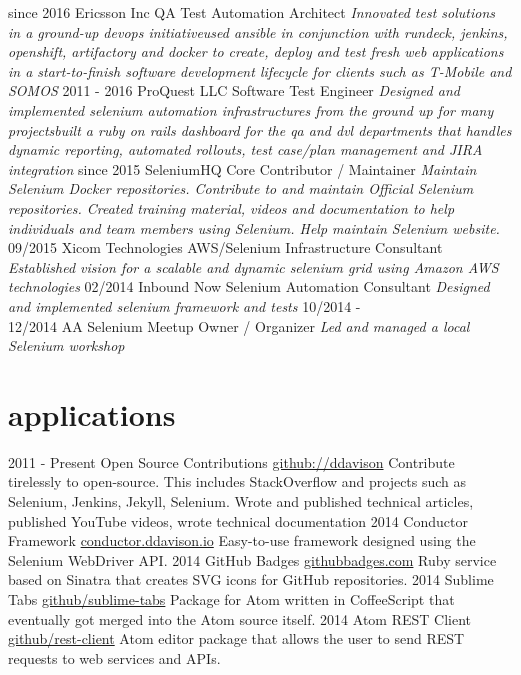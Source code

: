 \documentclass[]{ddavison-resume}
\begin{document}
\begin{entrylist}
  \entry
         {since 2016}
         {Ericsson Inc}
         {QA Test Automation Architect}
         {\emph{Innovated test solutions in a ground-up devops initiative\bullet used ansible in conjunction with rundeck, jenkins, openshift, artifactory and docker to create, deploy and test fresh web applications in a start-to-finish software development lifecycle for clients such as T-Mobile and SOMOS}}
  \entry
  	{2011 - 2016}
  	{ProQuest LLC}
  	{Software Test Engineer}
  	{\emph{Designed and implemented selenium automation infrastructures from the ground up for many projects\bullet built a ruby on rails dashboard for the qa and dvl departments that handles dynamic reporting, automated rollouts, test case/plan management and JIRA integration}} 
  \entry
  	{since 2015}
  	{SeleniumHQ}
  	{Core Contributor / Maintainer}
  	{\emph{Maintain Selenium Docker repositories.  Contribute to and maintain Official Selenium repositories. Created training material, videos and documentation to help individuals and team members using Selenium.  Help maintain Selenium website.}}
  \entry
  	{09/2015}
  	{Xicom Technologies}
  	{AWS/Selenium Infrastructure Consultant}
  	{\emph{Established vision for a scalable and dynamic selenium grid using Amazon AWS technologies}}
  \entry
  	{02/2014}
  	{Inbound Now}
  	{Selenium Automation Consultant}
  	{\emph{Designed and implemented selenium framework and tests}}
  \entry
  	{10/2014 - \\
  	12/2014}
  	{AA Selenium Meetup}
  	{Owner / Organizer}
  	{\emph{Led and managed a local Selenium workshop}}
\end{entrylist}

\section{applications}

\begin{entrylist}
  \entry
    {2011 - Present}
    {Open Source Contributions}
    {\href{https://github.com/ddavison}{github://ddavison}}
    {Contribute tirelessly to open-source.  This includes StackOverflow and projects such as Selenium, Jenkins, Jekyll, Selenium. Wrote and published technical articles, published YouTube videos, wrote technical documentation}
  \entry
    {2014}
    {Conductor Framework}
    {\href{https://conductor.ddavison.io}{conductor.ddavison.io}}
    {Easy-to-use framework designed using the Selenium WebDriver API.}
  \entry
    {2014}
    {GitHub Badges}
    {\href{https://github.com/ddavison/github-badges}{githubbadges.com}}
    {Ruby service based on Sinatra that creates SVG icons for GitHub repositories.}
  \entry
    {2014}
    {Sublime Tabs}
    {\href{https://github.com/ddavison/sublime-tabs}{github/sublime-tabs}}
    {Package for Atom written in CoffeeScript that eventually got merged into the Atom source itself.}
  \entry
  	{2014}
  	{Atom REST Client}
  	{\href{https://github.com/ddavison/rest-client}{github/rest-client}}
  	{Atom editor package that allows the user to send REST requests to web services and APIs.}
\end{entrylist}
\end{document}
